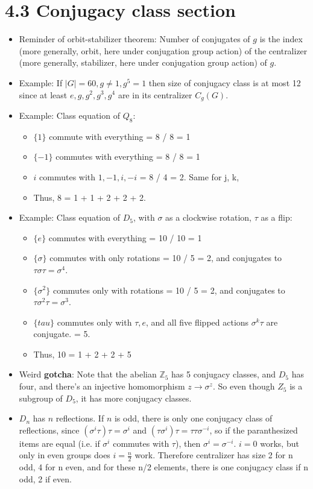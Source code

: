 \documentclass[11pt, oneside]{article}   	%
\begin{document}
\section{4.3 Conjugacy class section}
\begin{itemize}
\item Reminder of orbit-stabilizer theorem: Number of conjugates of $g$ is the index (more generally, orbit, here under  conjugation group action) of the centralizer (more generally, stabilizer, here under conjugation group action) of $g$.
\item Example: If $|G| = 60, g \neq 1, g^5 = 1$ then size of conjugacy class is at most 12 since at least $e, g, g^2, g^3, g^4$ are in its centralizer $C_g(G)$.
\item Example: Class equation of $Q_8$:
  \begin{itemize}
  \item $\{1\}$ commute with everything = 8 / 8 = 1
  \item $\{-1\}$ commutes with everything = 8 / 8 = 1
  \item $i$ commutes with $1, -1, i, -i$ = 8 / 4 = 2.  Same for j, k,
  \item Thus, 8 = 1 + 1 + 2 + 2 + 2.
  \end{itemize}
\item Example: Class equation of $D_5$, with $\sigma$ as a clockwise rotation, $\tau$ as a flip:
  \begin{itemize}
  \item $\{e\}$ commutes with everything = 10 / 10 = 1
  \item $\{\sigma\}$ commutes with only rotations = 10 / 5  = 2, and conjugates to $\tau\sigma\tau = \sigma^4$.
  \item $\{\sigma^2\}$ commutes only with rotations = 10 / 5 = 2, and conjugates to $\tau\sigma^2\tau = \sigma^3$.
  \item $\{tau\}$ commutes only with $\tau, e$, and all five flipped actions $\sigma^k\tau$ are conjugate. = 5.
  \item Thus, 10 = 1 + 2 + 2 + 5
  \end{itemize}
\item Weird \textbf{gotcha}: Note that the abelian $\mathbb{Z}_5$ has 5 conjugacy classes, and $D_5$ has four, and there's an injective homomorphism $z \rightarrow \sigma^z$.  So even though $Z_5$ is a subgroup of $D_5$, it has more conjugacy classes.
\item $D_n$ has $n$ reflections.  If $n$ is odd, there is only one conjugacy class of reflections, since $(\sigma^i\tau)\tau = \sigma^i$ and $(\tau\sigma^i)\tau = \tau\tau\sigma^{-i}$, so if the paranthesized items are equal (i.e. if $\sigma^i$ commutes with $\tau$), then $\sigma^i = \sigma^{-i}$.  $i=0$ works, but only in even groups does $i=\frac{n}{2}$ work.  Therefore centralizer has size 2 for n odd, 4 for n even, and for these n/2 elements, there is one conjugacy class if n odd, 2 if even.

\end{itemize}
\end{document}
